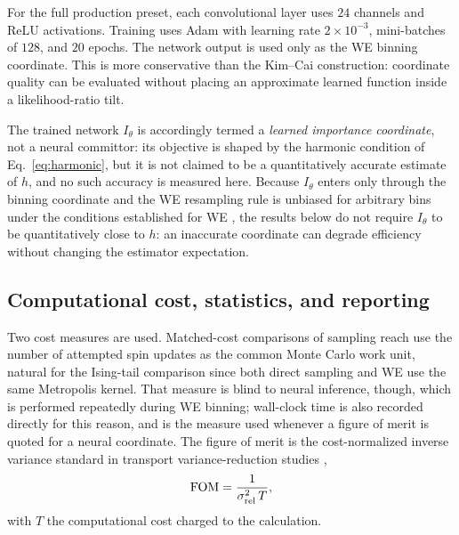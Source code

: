\documentclass[a4paper,fleqn]{cas-sc}
\newcommand{\FOM}{\mathrm{FOM}}
\begin{document}
For the full production preset, each convolutional layer uses $24$ channels and ReLU
activations. Training uses Adam with learning rate $2\times10^{-3}$, mini-batches of $128$, and
$20$ epochs. The network output is used only as the WE binning coordinate. This is more
conservative than the Kim--Cai construction: coordinate quality can be evaluated without
placing an approximate learned function inside a likelihood-ratio tilt.

The trained network $I_\theta$ is accordingly termed a \emph{learned importance coordinate},
not a neural committor: its objective is shaped by the harmonic condition of
Eq.~\eqref{eq:harmonic}, but it is not claimed to be a quantitatively accurate estimate of $h$,
and no such accuracy is measured here. Because $I_\theta$ enters only through the binning coordinate and the WE resampling rule is
unbiased for arbitrary bins under the conditions established for WE \citep{zhang2010}, the
results below do not require $I_\theta$ to be quantitatively close to $h$: an inaccurate
coordinate can degrade efficiency without changing the estimator expectation.

\subsection{Computational cost, statistics, and reporting}\label{sec:cost}
Two cost measures are used. Matched-cost comparisons of sampling reach use the number of
attempted spin updates as the common Monte Carlo work unit, natural for the Ising-tail
comparison since both direct sampling and WE use the same Metropolis kernel. That measure is
blind to neural inference, though, which is performed repeatedly during WE binning; wall-clock
time is also recorded directly for this reason, and is the measure used whenever a figure of
merit is quoted for a neural coordinate. The figure of merit is the cost-normalized inverse
variance standard in transport variance-reduction studies \citep{spanier1969,wagnerfw2014},
\begin{equation}
\FOM=\frac{1}{\sigma_{\rm rel}^{2}\,T},
\label{eq:fom}
\end{equation}
with $T$ the computational cost charged to the calculation.
\end{document}
